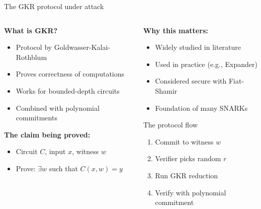 \documentclass[aspectratio=169, lualatex, handout]{beamer}
\begin{document}
\begin{frame}{The GKR protocol under attack}
	\begin{columns}[c]
		\begin{column}{0.5\textwidth}
			\textbf{What is GKR?}
			\begin{itemize}
				\item Protocol by Goldwasser-Kalai-Rothblum
				\item Proves correctness of computations
				\item Works for bounded-depth circuits
				\item Combined with polynomial commitments
			\end{itemize}
			\vspace{0.5em}
			\textbf{The claim being proved:}
			\begin{itemize}
				\item Circuit $C$, input $x$, witness $w$
				\item Prove: $\exists w$ such that $C(x,w) = y$
			\end{itemize}
		\end{column}
		\begin{column}{0.5\textwidth}
			\textbf{Why this matters:}
			\begin{itemize}
				\item Widely studied in literature
				\item Used in practice (e.g., Expander)
				\item Considered secure with Fiat-Shamir
				\item Foundation of many SNARKs
			\end{itemize}
			\vspace{0.5em}
			\begin{exampleblock}{The protocol flow}
				\begin{enumerate}
					\item Commit to witness $w$
					\item Verifier picks random $r$
					\item Run GKR reduction
					\item Verify with polynomial commitment
				\end{enumerate}
			\end{exampleblock}
		\end{column}
	\end{columns}
\end{frame}
\end{document}
